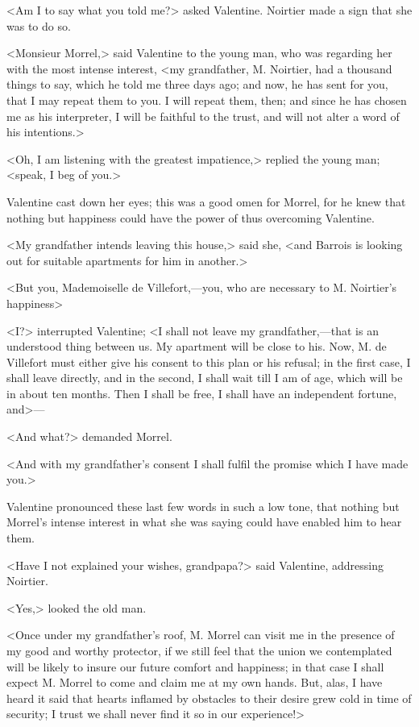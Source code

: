  <Am I to say what you told me?> asked Valentine. Noirtier made a sign that she was to do so. 

 <Monsieur Morrel,> said Valentine to the young man, who was regarding her with the most intense interest, <my grandfather, M. Noirtier, had a thousand things to say, which he told me three days ago; and now, he has sent for you, that I may repeat them to you. I will repeat them, then; and since he has chosen me as his interpreter, I will be faithful to the trust, and will not alter a word of his intentions.> 

 <Oh, I am listening with the greatest impatience,> replied the young man; <speak, I beg of you.> 

 Valentine cast down her eyes; this was a good omen for Morrel, for he knew that nothing but happiness could have the power of thus overcoming Valentine. 

 <My grandfather intends leaving this house,> said she, <and Barrois is looking out for suitable apartments for him in another.> 

 <But you, Mademoiselle de Villefort,—you, who are necessary to M. Noirtier's happiness\longdash> 

 <I?> interrupted Valentine; <I shall not leave my grandfather,—that is an understood thing between us. My apartment will be close to his. Now, M. de Villefort must either give his consent to this plan or his refusal; in the first case, I shall leave directly, and in the second, I shall wait till I am of age, which will be in about ten months. Then I shall be free, I shall have an independent fortune, and>— 

 <And what?> demanded Morrel. 

 <And with my grandfather's consent I shall fulfil the promise which I have made you.> 

 Valentine pronounced these last few words in such a low tone, that nothing but Morrel's intense interest in what she was saying could have enabled him to hear them. 

 <Have I not explained your wishes, grandpapa?> said Valentine, addressing Noirtier. 

 <Yes,> looked the old man. 

 <Once under my grandfather's roof, M. Morrel can visit me in the presence of my good and worthy protector, if we still feel that the union we contemplated will be likely to insure our future comfort and happiness; in that case I shall expect M. Morrel to come and claim me at my own hands. But, alas, I have heard it said that hearts inflamed by obstacles to their desire grew cold in time of security; I trust we shall never find it so in our experience!> 

